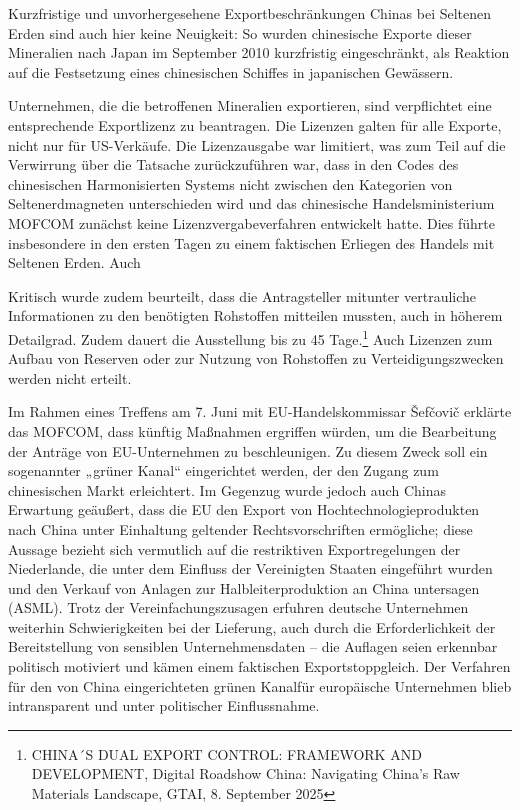 \documentclass[12pt,a4paper,oneside]{book} %
\begin{document}
Kurzfristige und unvorhergesehene Exportbeschränkungen Chinas bei Seltenen Erden sind auch hier keine Neuigkeit: So wurden chinesische Exporte dieser Mineralien nach Japan im September 2010 kurzfristig eingeschränkt, als Reaktion auf die Festsetzung eines chinesischen Schiffes in japanischen Gewässern.


Unternehmen, die die betroffenen Mineralien exportieren, sind verpflichtet eine entsprechende Exportlizenz zu beantragen.\autocite[Dessen Beantragung veranschlagt sechs Wochen;]{Wolf. Edda: China führt Exportauflagen für kritische Metalle ein, GTAI} Die Lizenzen galten für alle Exporte, nicht nur für US-Verkäufe. Die Lizenzausgabe war limitiert, was zum Teil auf die Verwirrung über die Tatsache zurückzuführen war, dass in den Codes des chinesischen Harmonisierten Systems nicht zwischen den Kategorien von Seltenerdmagneten unterschieden wird und das chinesische Handelsministerium MOFCOM zunächst keine Lizenzvergabeverfahren entwickelt hatte. Dies führte insbesondere in den ersten Tagen zu einem faktischen Erliegen des Handels mit Seltenen Erden. Auch 

Kritisch wurde zudem beurteilt, dass die Antragsteller mitunter vertrauliche Informationen zu den benötigten Rohstoffen mitteilen mussten, auch in höherem Detailgrad. Zudem dauert die Ausstellung bis zu 45 Tage.\footnote{CHINA´S DUAL EXPORT CONTROL: FRAMEWORK AND DEVELOPMENT, Digital Roadshow China: Navigating China’s Raw Materials Landscape, GTAI, 8. September 2025} Auch Lizenzen zum Aufbau von Reserven oder zur Nutzung von Rohstoffen zu Verteidigungszwecken werden nicht erteilt.

Im Rahmen eines Treffens am 7. Juni mit EU-Handelskommissar Šefčovič erklärte das MOFCOM, dass künftig Maßnahmen ergriffen würden, um die Bearbeitung der Anträge von EU-Unternehmen zu beschleunigen. Zu diesem Zweck soll ein sogenannter „grüner Kanal“ eingerichtet werden, der den Zugang zum chinesischen Markt erleichtert. Im Gegenzug wurde jedoch auch Chinas Erwartung geäußert, dass die EU den Export von Hochtechnologieprodukten nach China unter Einhaltung geltender Rechtsvorschriften ermögliche; diese Aussage bezieht sich vermutlich auf die restriktiven Exportregelungen der Niederlande, die unter dem Einfluss der Vereinigten Staaten eingeführt wurden und den Verkauf von Anlagen zur Halbleiterproduktion an China untersagen (ASML). 
Trotz der Vereinfachungszusagen erfuhren deutsche Unternehmen weiterhin Schwierigkeiten bei der Lieferung, auch durch die Erforderlichkeit der Bereitstellung von sensiblen Unternehmensdaten -- die Auflagen seien \glqq erkennbar politisch motiviert\grqq\autocite{Wirtschaft fordert mehr Tempo bei Rohstofffonds} und kämen einem \glqq faktischen Exportstopp\grqq gleich.\autocite{Seiwert, M.} Der Verfahren für den von China eingerichteten \glqq grünen Kanal\grqq für europäische Unternehmen blieb intransparent und unter politischer Einflussnahme.\autocite{Handelsblatt Loesekrug}
\end{document}

